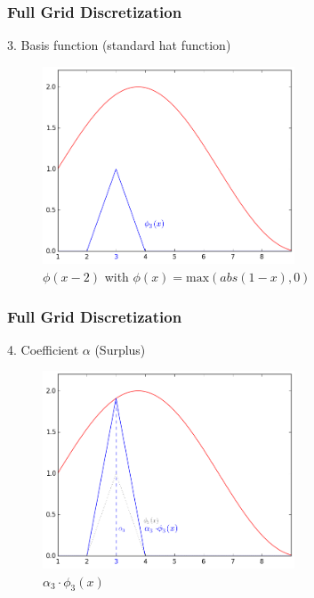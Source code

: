 \begin{frame}
  \frametitle{Full Grid Discretization}
  \topline
  \vspace{-10px}
  \begin{block}{3. Basis function (standard hat function)}
    \begin{figure}[!htp]

      \centering
      \includegraphics[width=7.5cm]{images/singlebasis_3}
      \vspace{-12px}
      \caption{$\phi(x - 2)$ with $\phi(x) = \text{max}(abs(1 - x), 0)$}
    \end{figure}
  \end{block}
\end{frame}

\begin{frame}
  \frametitle{Full Grid Discretization}
  \topline
  \vspace{-10px}
  \begin{block}{4. Coefficient $\alpha$ (Surplus)}
    \begin{figure}[!htp]

      \centering
      \includegraphics[width=7.5cm]{images/singlebasis_4}
      \vspace{-12px}
      \caption{$\alpha_3 \cdot \phi_3(x)$}
    \end{figure}
  \end{block}
\end{frame}

